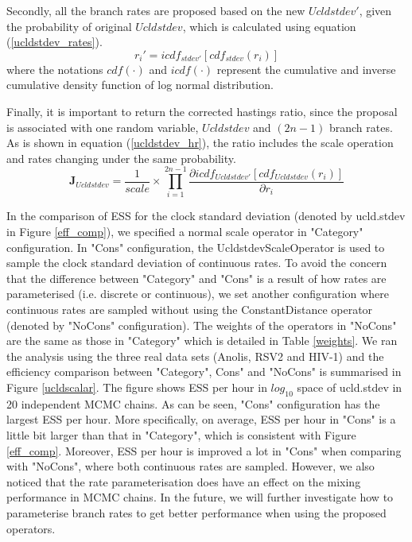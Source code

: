 \documentclass{bmcart}
\begin{document}
\begin{backmatter}
Secondly, all the branch rates are proposed based on the new $Ucldstdev'$, given the probability of original $Ucldstdev$, which is calculated using equation (\ref{ucldstdev_rates}).
\begin{equation}\label{ucldstdev_rates}
r_{i}' = icd{f_{stdev'}}\left[ {cd{f_{stdev}}({r_i})} \right]
\end{equation}
where the notations $cdf(\cdot)$ and $icdf(\cdot)$ represent the cumulative and inverse cumulative density function of log normal distribution.

Finally, it is important to return the corrected hastings ratio, since the proposal is associated with one random variable, $Ucldstdev$ and $(2n-1)$ branch rates. As is shown in equation (\ref{ucldstdev_hr}), the ratio includes the scale operation and rates changing under the same probability.
\begin{equation}\label{ucldstdev_hr}
{{\mathbf{J}}_{Ucldstdev}} = \frac{1}{{scale}} \times \prod\limits_{i = 1}^{2n - 1} {\frac{{\partial icd{f_{Ucldstdev'}}[cd{f_{Ucldstdev}}({r_i})]}}{{\partial {r_i}}}}
\end{equation}

In the comparison of ESS for the clock standard deviation (denoted by ucld.stdev in Figure \ref{eff_comp}), we specified a normal scale operator in "Category" configuration. In "Cons" configuration, the UcldstdevScaleOperator is used to sample the clock standard deviation of continuous rates. To avoid the concern that the difference between "Category" and "Cons" is a result of how rates are parameterised (i.e. discrete or continuous), we set another configuration where continuous rates are sampled without using the ConstantDistance operator (denoted by "NoCons" configuration). The weights of the operators in "NoCons" are the same as those in "Category" which is detailed in Table \ref{weights}. We ran the analysis using the three real data sets (Anolis, RSV2 and HIV-1) and the efficiency comparison between "Category", Cons" and "NoCons" is summarised in Figure \ref{ucldscalar}. The figure shows ESS per hour in ${log_{10}}$ space of ucld.stdev in 20 independent MCMC chains. As can be seen, "Cons" configuration has the largest ESS per hour. More specifically, on average, ESS per hour in "Cons" is a little bit larger than that in "Category", which is consistent with Figure \ref{eff_comp}. Moreover, ESS per hour is improved a lot in "Cons" when comparing with "NoCons", where both continuous rates are sampled. However, we also noticed that the rate parameterisation does have an effect on the mixing performance in MCMC chains. In the future, we will further investigate how to parameterise branch rates to get better performance when using the proposed operators.

\end{backmatter}
\end{document}
